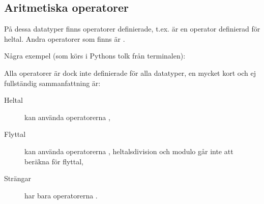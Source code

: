 \documentclass{beamer}
\begin{document}
\subsection{Aritmetiska operatorer}

\begin{frame}{\insertsubsectionhead}
  På dessa datatyper finns operatorer definierade, t.ex. \code{+} är en 
  operator definierad för heltal.
  Andra operatorer som finns är \code{+ - * / // \%}.
\end{frame}

\begin{frame}[fragile]{\insertsubsectionhead}
  Några exempel (som körs i Pythons tolk från terminalen):
\end{frame}

\begin{frame}{\insertsubsectionhead}
  Alla operatorer är dock inte definierade för alla datatyper, en mycket kort
  och ej fullständig sammanfattning är:
  \begin{description}
    \item[Heltal] kan använda operatorerna \code{+ - * / // \%},
    \item[Flyttal] kan använda operatorerna \code{+ - * /}, heltalsdivision
    och modulo går inte att beräkna för flyttal,
    \item[Strängar] har bara operatorerna \code{+ *}.
  \end{description}
\end{frame}


%
\end{document}
